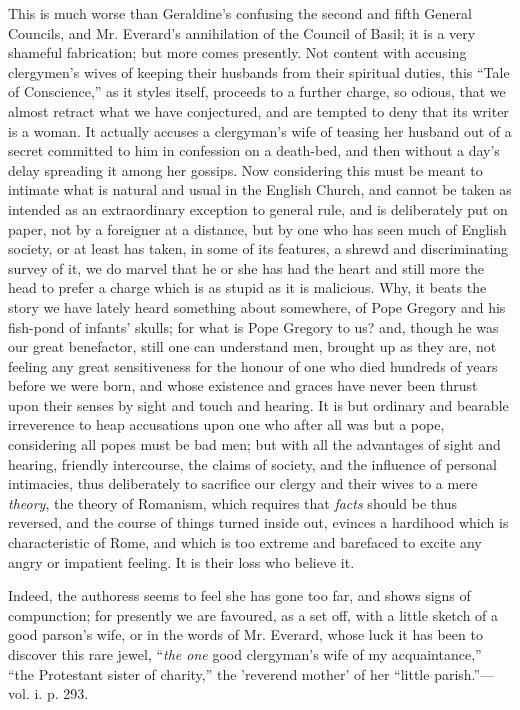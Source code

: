 This is much worse than Geraldine's confusing the
second and fifth General Councils, and Mr. Everard's annihilation
of the Council of Basil; it is a very shameful fabrication; but more
comes presently. Not content with accusing clergymen's wives of keeping
their husbands from their spiritual duties, this ``Tale of Conscience,''
as it styles itself, proceeds to a further charge, so odious, that we
almost retract what we have conjectured, and are tempted to deny that
its writer is a woman. It actually accuses a clergyman's wife of teasing
her husband out of a secret committed to him in confession on a
death-bed, and then without a day's delay spreading it among her
gossips. Now considering this must be meant to intimate what is natural
and usual in the English Church, and cannot be taken as intended as an
extraordinary exception to general rule, and is deliberately put on
paper, not by a foreigner at a distance, but by one who has seen much of
English society, or at least has taken, in some of its features, a
shrewd and discriminating survey of it, we do marvel that he or she has
had the heart and still more the head to prefer a charge which is as
stupid as it is malicious. Why, it beats the story we have lately heard
something about somewhere, of Pope Gregory and his fish-pond of infants'
skulls; for what is Pope Gregory to us? and, though he was our great
benefactor, still one can understand men, brought up as they are, not
feeling any great sensitiveness for the honour of one who died hundreds
of years before we were born, and whose existence and graces have never
been thrust upon their senses by sight and touch and hearing. It is but
ordinary and bearable irreverence to heap accusations upon one who after
all was but a pope, considering all popes must be bad men; but with all
the advantages of sight and hearing, friendly intercourse, the claims of
society, and the influence of personal intimacies, thus deliberately to
sacrifice our clergy and their wives to a mere \emph{theory}, the theory
of Romanism, which requires that \emph{facts} should be thus reversed,
and the course of things turned inside out, evinces a hardihood which is
characteristic of Rome, and which is too extreme and barefaced to excite
any angry or impatient feeling. It is their loss who believe it.

Indeed, the authoress seems to feel she has gone
too far, and shows signs of compunction; for presently we are favoured,
as a set off, with a little sketch of a good parson's wife, or in the
words of Mr. Everard, whose luck it has been to discover this rare
jewel, ``\emph{the one} good clergyman's wife of my acquaintance,'' ``the
Protestant sister of charity,'' the 'reverend mother' of her ``little
parish.''—vol. i. p. 293.

